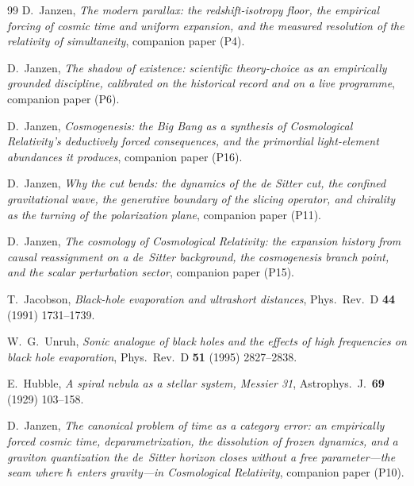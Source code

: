 \documentclass[11pt,a4paper]{article}
\theoremstyle{plain}
\theoremstyle{remark}
\begin{document}
\begin{thebibliography}{99}
 D.~Janzen, \emph{The modern parallax: the redshift-isotropy floor, the empirical forcing of cosmic time and uniform expansion, and the measured resolution of the relativity of simultaneity}, companion paper (P4).

 D.~Janzen, \emph{The shadow of existence: scientific theory-choice as an empirically grounded discipline, calibrated on the historical record and on a live programme}, companion paper (P6).

 D.~Janzen, \emph{Cosmogenesis: the Big Bang as a synthesis of Cosmological Relativity's deductively forced consequences, and the primordial light-element abundances it produces}, companion paper (P16).

 D.~Janzen, \emph{Why the cut bends: the dynamics of the de Sitter cut, the confined gravitational wave, the generative boundary of the slicing operator, and chirality as the turning of the polarization plane}, companion paper (P11).

 D.~Janzen, \emph{The cosmology of Cosmological Relativity: the expansion history from causal reassignment on a de~Sitter background, the cosmogenesis branch point, and the scalar perturbation sector}, companion paper (P15).

T.~Jacobson,
\emph{Black-hole evaporation and ultrashort distances},
Phys.~Rev.~D \textbf{44} (1991) 1731--1739.

W.~G.~Unruh,
\emph{Sonic analogue of black holes and the effects of high frequencies on black hole evaporation},
Phys.~Rev.~D \textbf{51} (1995) 2827--2838.

E.~Hubble,
\emph{A spiral nebula as a stellar system, Messier 31},
Astrophys.~J.~\textbf{69} (1929) 103--158.

D.~Janzen,
\emph{The canonical problem of time as a category error: an empirically forced cosmic time, deparametrization, the dissolution of frozen dynamics, and a graviton quantization the de~Sitter horizon closes without a free parameter---the seam where $\hbar$ enters gravity---in Cosmological Relativity}, companion paper (P10).
\end{thebibliography}



\end{document}
